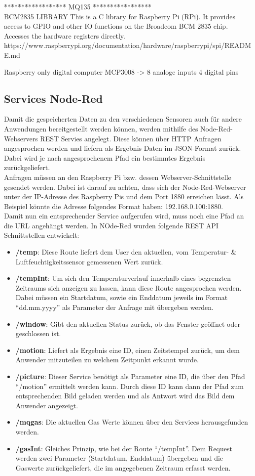 ******************
MQ135
*****************
\\

BCM2835 LIBRARY
This is a C library for Raspberry Pi (RPi). It provides access to GPIO and other IO functions on the Broadcom BCM 2835 chip. Accesses the hardware registers directly.
https://www.raspberrypi.org/documentation/hardware/raspberrypi/spi/README.md

Raspberry only digital computer 
MCP3008 -> 8 analoge inputs 4 digital pins


\subsection{Services Node-Red}
Damit die gespeicherten Daten zu den verschiedenen Sensoren auch für andere Anwendungen bereitgestellt werden können, werden mithilfe des Node-Red-Webservers REST Servies angelegt. Diese können über \ac{HTTP} Anfragen angesprochen werden und liefern als Ergebnis Daten im \ac{JSON}-Format zurück. Dabei wird je nach angesprochenem Pfad ein bestimmtes Ergebnis zurückgeliefert. \\Anfragen müssen an den Raspberry Pi bzw. dessen Webserver-Schnittstelle gesendet werden. Dabei ist darauf zu achten, dass sich der Node-Red-Webserver unter der \ac{IP}-Adresse des Raspberry Pis und dem Port 1880 erreichen lässt. Als Beispiel könnte die Adresse folgendes Format haben: 192.168.0.100:1880. \\Damit nun ein entsprechender Service aufgerufen wird, muss noch eine Pfad an die \ac{URL} angehängt werden. In NOde-Red wurden folgende REST \ac{API} Schnittstellen entwickelt:
\begin{itemize}
	\item \textbf{/temp}: Diese Route liefert dem User den aktuellen, vom Temperatur- \& Luftfeuchtigkeitssensor gemessenen Wert zurück. 
	\item \textbf{/tempInt}: Um sich den Temperaturverlauf innerhalb eines begrenzten Zeitraums sich anzeigen zu lassen, kann diese Route angesprochen werden. Dabei müssen ein Startdatum, sowie ein Enddatum jeweils im Format \enquote{dd.mm.yyyy} als Parameter der Anfrage mit übergeben werden.
	\item \textbf{/window}: Gibt den aktuellen Status zurück, ob das Fenster geöffnet oder geschlossen ist.
	\item \textbf{/motion}: Liefert als Ergebnis eine ID, einen Zeitstempel zurück, um dem Anwender mitzuteilen zu welchem Zeitpunkt erkannt wurde.
	\item \textbf{/picture}: Dieser Service benötigt als Parameter eine ID, die über den Pfad \enquote{/motion} ermittelt werden kann. Durch diese ID kann dann der Pfad zum entsprechenden Bild geladen werden und als Antwort wird das Bild dem Anwender angezeigt.
	\item \textbf{/mqgas}: Die aktuellen Gas Werte können über den Services herausgefunden werden.
	\item \textbf{/gasInt}: Gleiches Prinzip, wie bei der Route \enquote{/tempInt}. Dem Request werden zwei Parameter (Startdatum, Enddatum) übergeben und die Gaswerte zurückgeliefert, die im angegebenen Zeitraum erfasst werden.
\end{itemize}

